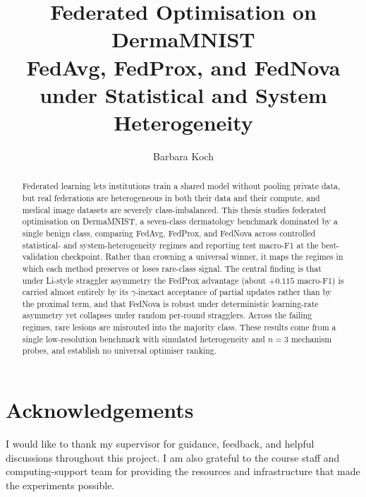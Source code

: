 \documentclass[11pt,a4paper]{report}
\title{Federated Optimisation on DermaMNIST\\
\large FedAvg, FedProx, and FedNova under Statistical and System Heterogeneity}
\author{Barbara Koch}
\date{}
\begin{document}

\maketitle

\begin{abstract}
Federated learning lets institutions train a shared model without pooling private
data, but real federations are heterogeneous in both their data and their compute,
and medical image datasets are severely class-imbalanced. This thesis studies
federated optimisation on DermaMNIST, a seven-class dermatology benchmark
dominated by a single benign class, comparing FedAvg, FedProx, and FedNova across
controlled statistical- and system-heterogeneity regimes and reporting test
macro-F1 at the best-validation checkpoint. Rather than crowning a universal
winner, it maps the regimes in which each method preserves or loses rare-class
signal. The central finding is that under Li-style straggler asymmetry the FedProx
advantage (about $+0.115$ macro-F1) is carried almost entirely by its
$\gamma$-inexact acceptance of partial updates rather than by the proximal term,
and that FedNova is robust under deterministic learning-rate asymmetry yet
collapses under random per-round stragglers. Across the failing regimes, rare
lesions are misrouted into the majority class. These results come from a single
low-resolution benchmark with simulated heterogeneity and $n=3$ mechanism probes,
and establish no universal optimiser ranking.
\end{abstract}

\chapter*{Acknowledgements}
I would like to thank my supervisor for guidance, feedback, and helpful
discussions throughout this project. I am also grateful to the course staff and
computing-support team for providing the resources and infrastructure that made
the experiments possible.

\tableofcontents
\listoffigures
\listoftables


\end{document}
